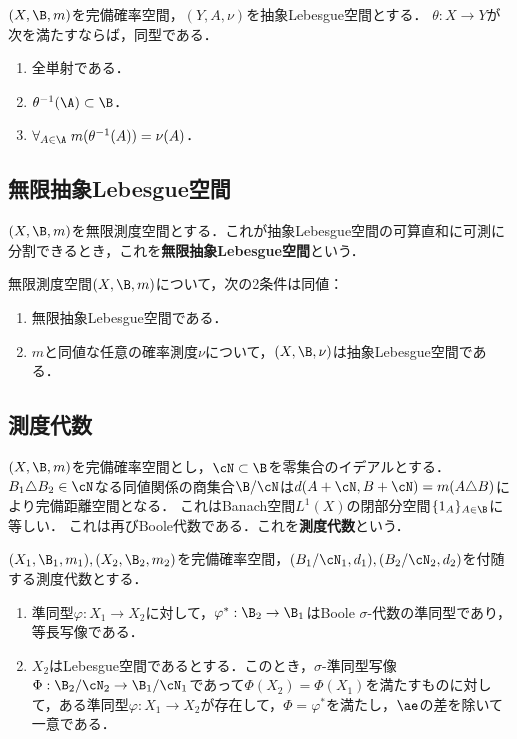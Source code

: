 \documentclass[uplatex,dvipdfmx]{jsreport}
\begin{document}
\begin{proposition}[抽象Lebesgue空間への同型の特徴付け]
    $(X,\B,m)$を完備確率空間，$(Y,A,\nu)$を抽象Lebesgue空間とする．
    $\theta:X\to Y$が次を満たすならば，同型である．
    \begin{enumerate}
        \item 全単射である．
        \item $\theta^{-1}(\A)\subset\B$．
        \item $\forall_{A\in\A}\;m(\theta^{-1}(A))=\nu(A)$．
    \end{enumerate}
\end{proposition}

\subsection{無限抽象Lebesgue空間}

\begin{definition}
    $(X,\B,m)$を無限測度空間とする．これが抽象Lebesgue空間の可算直和に可測に分割できるとき，これを\textbf{無限抽象Lebesgue空間}という．
\end{definition}

\begin{proposition}
    無限測度空間$(X,\B,m)$について，次の2条件は同値：
    \begin{enumerate}
        \item 無限抽象Lebesgue空間である．
        \item $m$と同値な任意の確率測度$\nu$について，$(X,\B,\nu)$は抽象Lebesgue空間である．
    \end{enumerate}
\end{proposition}

\subsection{測度代数}

\begin{proposition}
    $(X,\B,m)$を完備確率空間とし，$\cN\subset\B$を零集合のイデアルとする．
    $B_1\triangle B_2\in\cN$なる同値関係の商集合$\B/\cN$は$d(A+\cN,B+\cN)=m(A\triangle B)$により完備距離空間となる．
    これはBanach空間$L^1(X)$の閉部分空間$\{1_A\}_{A\in\B}$に等しい．
    これは再びBoole代数である．これを\textbf{測度代数}という．
\end{proposition}

\begin{theorem}
    $(X_1,\B_1,m_1),(X_2,\B_2,m_2)$を完備確率空間，$(B_1/\cN_1,d_1),(B_2/\cN_2,d_2)$を付随する測度代数とする．
    \begin{enumerate}
        \item 準同型$\varphi:X_1\to X_2$に対して，$\varphi^*:\B_2\to\B_1$はBoole $\sigma$-代数の準同型であり，等長写像である．
        \item $X_2$はLebesgue空間であるとする．このとき，$\sigma$-準同型写像$\Phi:\B_2/\cN_2\to\B_1/\cN_1$であって$\Phi(X_2)=\Phi(X_1)$を満たすものに対して，ある準同型$\varphi:X_1\to X_2$が存在して，$\Phi=\varphi^*$を満たし，$\ae$の差を除いて一意である．
    \end{enumerate}
\end{theorem}
\end{document}
